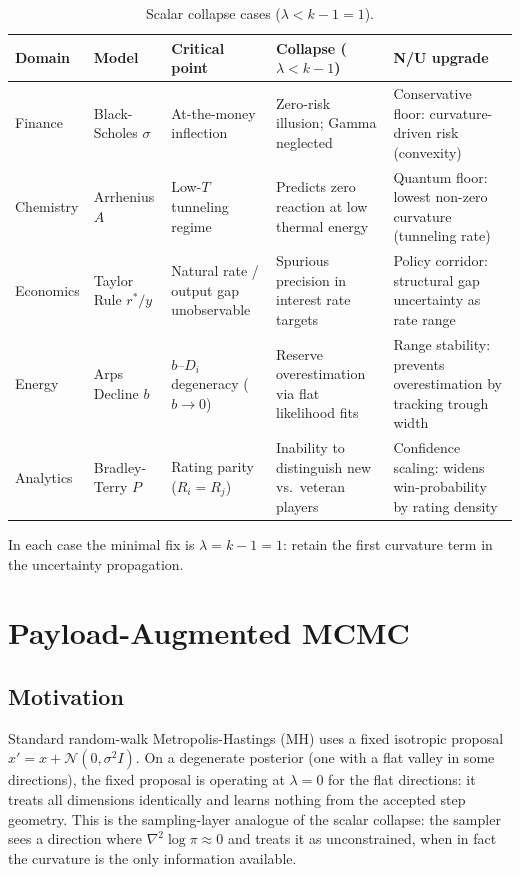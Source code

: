 \documentclass[11pt]{article}
\theoremstyle{definition}
\begin{document}
\begin{table}[h]
\centering
\caption{Scalar collapse cases ($\lambda < k-1 = 1$).}
\label{tab:collapse}
\setlength{\tabcolsep}{5pt}
\begin{tabular}{llp{3.2cm}p{3.5cm}p{3.5cm}}
\toprule
Domain & Model & Critical point & Collapse ($\lambda < k-1$) & N/U upgrade \\
\midrule
Finance     & Black-Scholes $\sigma$ & At-the-money inflection & Zero-risk illusion; Gamma neglected & Conservative floor: curvature-driven risk (convexity) \\[3pt]
Chemistry   & Arrhenius $A$          & Low-$T$ tunneling regime & Predicts zero reaction at low thermal energy & Quantum floor: lowest non-zero curvature (tunneling rate) \\[3pt]
Economics   & Taylor Rule $r^*/y$    & Natural rate / output gap unobservable & Spurious precision in interest rate targets & Policy corridor: structural gap uncertainty as rate range \\[3pt]
Energy      & Arps Decline $b$       & $b$--$D_i$ degeneracy ($b \to 0$) & Reserve overestimation via flat likelihood fits & Range stability: prevents overestimation by tracking trough width \\[3pt]
Analytics   & Bradley-Terry $P$      & Rating parity ($R_i = R_j$) & Inability to distinguish new vs.\ veteran players & Confidence scaling: widens win-probability by rating density \\
\bottomrule
\end{tabular}
\end{table}

In each case the minimal fix is $\lambda = k-1 = 1$:
retain the first curvature term in the uncertainty propagation.

\section{Payload-Augmented MCMC}
\label{sec:pamcmc}

\subsection{Motivation}

Standard random-walk Metropolis-Hastings (MH) uses a fixed isotropic proposal
$x' = x + \mathcal{N}(0, \sigma^2 I)$.
On a degenerate posterior (one with a flat valley in some directions), the fixed
proposal is operating at $\lambda = 0$ for the flat directions: it treats all
dimensions identically and learns nothing from the accepted step geometry.
This is the sampling-layer analogue of the scalar collapse: the sampler sees a
direction where $\nabla^2 \log \pi \approx 0$ and treats it as unconstrained,
when in fact the curvature is the only information available.
\end{document}
